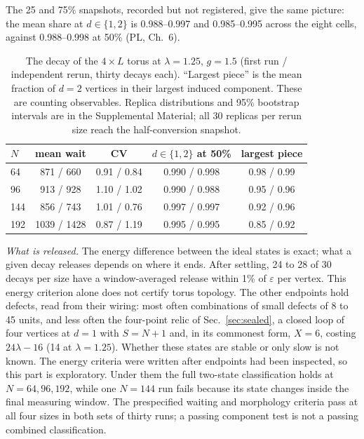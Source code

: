 \documentclass[aps,pre,10pt,twocolumn,superscriptaddress,nofootinbib]{revtex4-2}
\begin{document}
The 25 and 75\% snapshots, recorded but not registered, give the same
picture: the mean share at $d \in \{1,2\}$ is 0.988--0.997 and 0.985--0.995 across the eight cells, against
0.988--0.998 at 50\% (PL, Ch.~6).

\begin{table}[b]
\caption{The decay of the $4\times L$ torus at $\lambda = 1.25$, $g = 1.5$ (first run / independent rerun,
thirty decays each). ``Largest piece'' is the mean fraction of $d=2$ vertices in their largest induced
component. These are counting observables. Replica distributions and 95\% bootstrap intervals are in
the Supplemental Material; all 30 replicas per rerun size reach the half-conversion snapshot.}
\label{tab:t7}
\begin{ruledtabular}
\begin{tabular}{lcccc}
$N$ & mean wait & CV & $d \in \{1,2\}$ at 50\% & largest piece \\
\hline
64  & 871 / 660  & 0.91 / 0.84 & 0.990 / 0.998 & 0.98 / 0.99 \\
96  & 913 / 928  & 1.10 / 1.02 & 0.990 / 0.988 & 0.95 / 0.96 \\
144 & 856 / 743  & 1.01 / 0.76 & 0.997 / 0.997 & 0.92 / 0.96 \\
192 & 1039 / 1428 & 0.87 / 1.19 & 0.995 / 0.995 & 0.85 / 0.92 \\
\end{tabular}
\end{ruledtabular}
\end{table}

\emph{What is released.} The energy difference between the ideal states is exact; what a given decay
releases depends on where it ends. After settling, 24 to 28 of 30 decays per size have a
window-averaged release within 1\% of $\varepsilon$ per vertex. This energy criterion alone does not
certify torus topology. The other endpoints hold defects, read from their wiring: most often
combinations of small defects of 8 to 45 units, and less often the four-point relic of
Sec.~\ref{sec:sealed}, a closed loop of four vertices at $d=1$ with $S=N+1$ and, in its commonest
form, $X=6$, costing $24\lambda-16$ (14 at $\lambda=1.25$). Whether these states are stable or only
slow is not known. The energy criteria were written after endpoints had been inspected, so this part
is exploratory. Under them the full two-state classification holds at $N=64,96,192$, while one
$N=144$ run fails because its state changes inside the final measuring window. The prespecified
waiting and morphology criteria pass at all four sizes in both sets of thirty runs; a passing
component test is not a passing combined classification.
\end{document}
